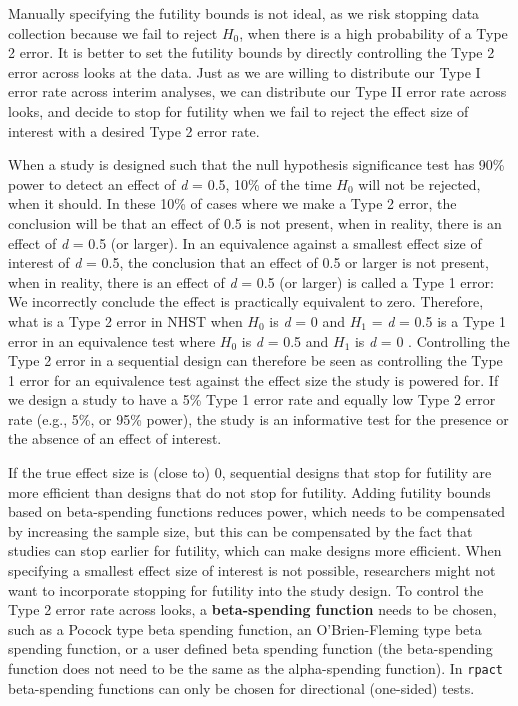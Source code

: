 \documentclass[
  oneside]{book}
\begin{document}
Manually specifying the futility bounds is not ideal, as we risk stopping data collection because we fail to reject \(H_0\), when there is a high probability of a Type 2 error. It is better to set the futility bounds by directly controlling the Type 2 error across looks at the data. Just as we are willing to distribute our Type I error rate across interim analyses, we can distribute our Type II error rate across looks, and decide to stop for futility when we fail to reject the effect size of interest with a desired Type 2 error rate.

When a study is designed such that the null hypothesis significance test has 90\% power to detect an effect of \emph{d} = 0.5, 10\% of the time \(H_0\) will not be rejected, when it should. In these 10\% of cases where we make a Type 2 error, the conclusion will be that an effect of 0.5 is not present, when in reality, there is an effect of \emph{d} = 0.5 (or larger). In an equivalence against a smallest effect size of interest of \emph{d} = 0.5, the conclusion that an effect of 0.5 or larger is not present, when in reality, there is an effect of \emph{d} = 0.5 (or larger) is called a Type 1 error: We incorrectly conclude the effect is practically equivalent to zero. Therefore, what is a Type 2 error in NHST when \(H_0\) is \emph{d} = 0 and \(H_1\) = \emph{d} = 0.5 is a Type 1 error in an equivalence test where \(H_0\) is \emph{d} = 0.5 and \(H_1\) is \emph{d} = 0 \citep{jennison_group_2000}. Controlling the Type 2 error in a sequential design can therefore be seen as controlling the Type 1 error for an equivalence test against the effect size the study is powered for. If we design a study to have a 5\% Type 1 error rate and equally low Type 2 error rate (e.g., 5\%, or 95\% power), the study is an informative test for the presence or the absence of an effect of interest.

If the true effect size is (close to) 0, sequential designs that stop for futility are more efficient than designs that do not stop for futility. Adding futility bounds based on beta-spending functions reduces power, which needs to be compensated by increasing the sample size, but this can be compensated by the fact that studies can stop earlier for futility, which can make designs more efficient. When specifying a smallest effect size of interest is not possible, researchers might not want to incorporate stopping for futility into the study design. To control the Type 2 error rate across looks, a \textbf{beta-spending function} needs to be chosen, such as a Pocock type beta spending function, an O'Brien-Fleming type beta spending function, or a user defined beta spending function (the beta-spending function does not need to be the same as the alpha-spending function). In \texttt{rpact} beta-spending functions can only be chosen for directional (one-sided) tests.
\end{document}
